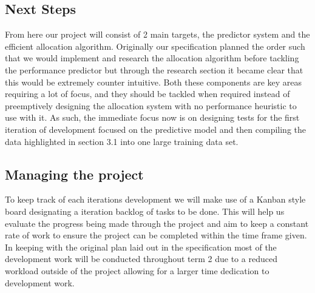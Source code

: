 \documentclass[twoside]{article}
\begin{document}
\subsection{Next Steps}
From here our project will consist of 2 main targets, the predictor system and the efficient allocation algorithm. Originally our specification planned the order such that we would implement and research the allocation algorithm before tackling the performance predictor but through the research section it became clear that this would be extremely counter intuitive. Both these components are key areas requiring a lot of focus, and they should be tackled when required instead of preemptively designing the allocation system with no performance heuristic to use with it. As such, the immediate focus now is on designing tests for the first iteration of development focused on the predictive model and then compiling the data highlighted in section 3.1 into one large training data set.\\
\subsection{Managing the project}
To keep track of each iterations development we will make use of a Kanban style board designating a iteration backlog of tasks to be done. This will help us evaluate the progress being made through the project and aim to keep a constant rate of work to ensure the project can be completed within the time frame given. In keeping with the original plan laid out in the specification most of the development work will be conducted throughout term 2 due to a reduced workload outside of the project allowing for a larger time dedication to development work.



\appendix


\end{document}
